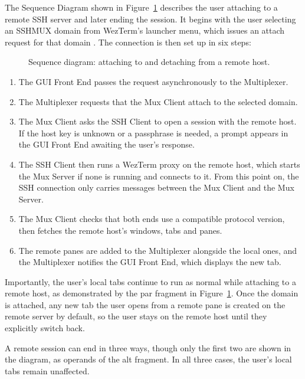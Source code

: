 The Sequence Diagram shown in Figure~\ref{fig:ssh-lifecycle} describes the user attaching to a remote SSH server and later ending the session. It begins with the user selecting an SSHMUX domain from WezTerm's launcher menu, which issues an attach request for that domain \cite{multiplexing}. The connection is then set up in six steps:

\begin{figure}[!tbp]
  \centering
  \caption{Sequence diagram: attaching to and detaching from a remote host.}
  \label{fig:ssh-lifecycle}
\end{figure}

\begin{enumerate}
  \item The GUI Front End passes the request asynchronously to the Multiplexer.
  \item The Multiplexer requests that the Mux Client attach to the selected domain.
  \item The Mux Client asks the SSH Client to open a session with the remote host. If the host key is unknown or a passphrase is needed, a prompt appears in the GUI Front End awaiting the user's response.
  \item The SSH Client then runs a WezTerm proxy on the remote host, which starts the Mux Server if none is running and connects to it. From this point on, the SSH connection only carries messages between the Mux Client and the Mux Server.
  \item The Mux Client checks that both ends use a compatible protocol version, then fetches the remote host's windows, tabs and panes.
  \item The remote panes are added to the Multiplexer alongside the local ones, and the Multiplexer notifies the GUI Front End, which displays the new tab.
\end{enumerate}

Importantly, the user's local tabs continue to run as normal while attaching to a remote host, as demonstrated by the par fragment in Figure~\ref{fig:ssh-lifecycle}. Once the domain is attached, any new tab the user opens from a remote pane is created on the remote server by default, so the user stays on the remote host until they explicitly switch back.

A remote session can end in three ways, though only the first two are shown in the diagram, as operands of the alt fragment. In all three cases, the user's local tabs remain unaffected.

